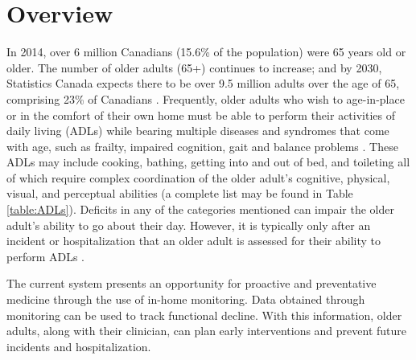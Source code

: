 %


\section{Overview}
In 2014, over 6 million Canadians (15.6\% of the population) were 65 years old or older. The number of older adults (65+) continues to increase; and by 2030, Statistics Canada expects there to be over 9.5 million adults over the age of 65, comprising 23\% of Canadians \cite{government_of_canada_daily_2014}. Frequently, older adults who wish to age-in-place or in the comfort of their own home must be able to perform their activities of daily living (ADLs) while bearing multiple diseases and syndromes that come with age, such as frailty, impaired cognition, gait and balance problems \cite{tijsen_challenging_2019}. These ADLs may include cooking, bathing, getting into and out of bed, and toileting all of which require complex coordination of the older adult’s cognitive, physical, visual, and perceptual abilities (a complete list may be found in Table \ref{table:ADLs}). Deficits in any of the categories mentioned can impair the older adult’s ability to go about their day. However, it is typically only after an incident or hospitalization that an older adult is assessed for their ability to perform ADLs \cite{wilkinson_comprehensive_2021}. 

The current system presents an opportunity for proactive and preventative medicine through the use of in-home monitoring. Data obtained through monitoring can be used to track functional decline. With this information, older adults, along with their clinician, can plan early interventions and prevent future incidents and hospitalization. 


